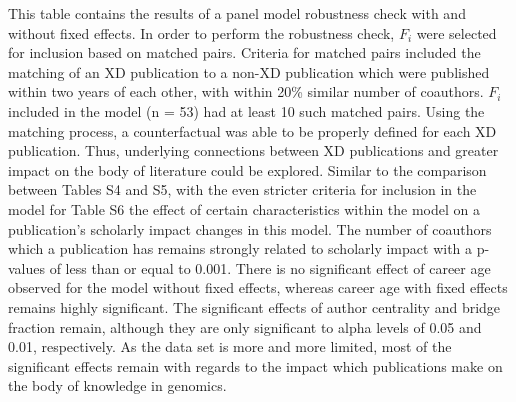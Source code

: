 \documentclass[10pt]{article}          %
\begin{document}
This table contains the results of a panel model robustness check with and without fixed effects. In order to perform the robustness check, $F_i$ were selected for inclusion based on matched pairs. Criteria for matched pairs included the matching of an XD publication to a non-XD publication which were published within two years of each other, with within 20\% similar number of coauthors. $F_i$  included in the model (n = 53) had at least 10 such matched pairs. Using the matching process, a counterfactual was able to be properly defined for each XD publication. Thus, underlying connections between XD publications and greater impact on the body of literature could be explored. Similar to the comparison between Tables S4 and S5, with the even stricter criteria for inclusion in the model for Table S6 the effect of certain characteristics within the model on a publication’s scholarly impact changes in this model. The number of coauthors which a publication has remains strongly related to scholarly impact with a p-values of less than or equal to 0.001. There is no significant effect of career age observed for the model without fixed effects, whereas career age with fixed effects remains highly significant. The significant effects of author centrality and bridge fraction remain, although they are only significant to alpha levels of 0.05 and 0.01, respectively. As the data set is more and more limited, most of the significant effects remain with regards to the impact which publications make on the body of knowledge in genomics.

\bigskip   %
\end{document}
